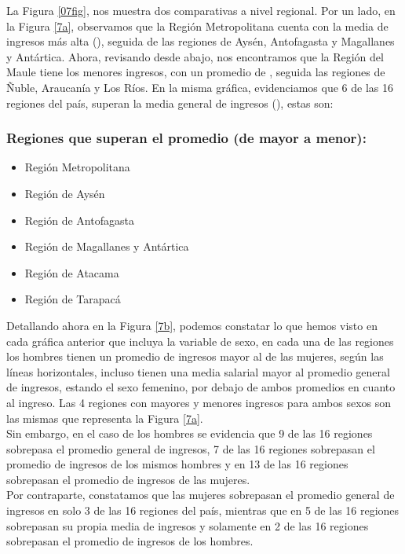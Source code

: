 \documentclass{article}
\begin{document}
	\FloatBarrier
	
	La Figura \ref{07fig}, nos muestra dos comparativas a nivel regional. Por un lado, en la Figura \ref{7a}, observamos que la Región Metropolitana cuenta con la media de ingresos más alta (), seguida de las regiones de Aysén, Antofagasta y Magallanes y Antártica. Ahora, revisando desde abajo, nos encontramos que la Región del Maule tiene los menores ingresos, con un promedio de , seguida las regiones de Ñuble, Araucanía y Los Ríos. En la misma gráfica, evidenciamos que 6 de las 16 regiones del país, superan la media general de ingresos (), estas son:
	
	\subsubsection*{Regiones que superan el promedio (de mayor a menor):}
	
	\begin{itemize}
		\item Región Metropolitana
		\item Región de Aysén
		\item Región de Antofagasta
		\item Región de Magallanes y Antártica
		\item Región de Atacama
		\item Región de Tarapacá
	\end{itemize}
	
	Detallando ahora en la Figura \ref{7b}, podemos constatar lo que hemos visto en cada gráfica anterior que incluya la variable de sexo, en cada una de las regiones los hombres tienen un promedio de ingresos mayor al de las mujeres, según las líneas horizontales, incluso tienen una media salarial mayor al promedio general de ingresos, estando el sexo femenino, por debajo de ambos promedios en cuanto al ingreso. Las 4 regiones con mayores y menores ingresos para ambos sexos son las mismas que representa la Figura \ref{7a}.\\
	
	Sin embargo, en el caso de los hombres se evidencia que 9 de las 16 regiones sobrepasa el promedio general de ingresos, 7 de las 16 regiones sobrepasan el promedio de ingresos de los mismos hombres y en 13 de las 16 regiones sobrepasan el promedio de ingresos de las mujeres.\\
	
	Por contraparte, constatamos que las mujeres sobrepasan el promedio general de ingresos en solo 3 de las 16 regiones del país, mientras que en 5 de las 16 regiones sobrepasan su propia media de ingresos y solamente en 2 de las 16 regiones sobrepasan el promedio de ingresos de los hombres.\\
	
\end{document}
